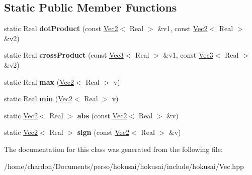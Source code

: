 \subsection*{Static Public Member Functions}
\begin{DoxyCompactItemize}
\item 
\hypertarget{classhokusai_1_1Vec2_ae9adba7c86e9fd15467694f6eabe49d5}{static Real {\bfseries dot\+Product} (const \hyperlink{classhokusai_1_1Vec2}{Vec2}$<$ Real $>$ \&v1, const \hyperlink{classhokusai_1_1Vec2}{Vec2}$<$ Real $>$ \&v2)}\label{classhokusai_1_1Vec2_ae9adba7c86e9fd15467694f6eabe49d5}

\item 
\hypertarget{classhokusai_1_1Vec2_acde8ab8c4be35179fda1d5b0c52e7a39}{static Real {\bfseries cross\+Product} (const \hyperlink{classhokusai_1_1Vec3}{Vec3}$<$ Real $>$ \&v1, const \hyperlink{classhokusai_1_1Vec3}{Vec3}$<$ Real $>$ \&v2)}\label{classhokusai_1_1Vec2_acde8ab8c4be35179fda1d5b0c52e7a39}

\item 
\hypertarget{classhokusai_1_1Vec2_ad44ab95bd955ad929aca423f2268e7f0}{static Real {\bfseries max} (\hyperlink{classhokusai_1_1Vec2}{Vec2}$<$ Real $>$ v)}\label{classhokusai_1_1Vec2_ad44ab95bd955ad929aca423f2268e7f0}

\item 
\hypertarget{classhokusai_1_1Vec2_a468f6993dba78df7e136497de7b85a8a}{static Real {\bfseries min} (\hyperlink{classhokusai_1_1Vec2}{Vec2}$<$ Real $>$ v)}\label{classhokusai_1_1Vec2_a468f6993dba78df7e136497de7b85a8a}

\item 
\hypertarget{classhokusai_1_1Vec2_a642930ab4b582b2cbc0ce76fa7fbbfe6}{static \hyperlink{classhokusai_1_1Vec2}{Vec2}$<$ Real $>$ {\bfseries abs} (const \hyperlink{classhokusai_1_1Vec2}{Vec2}$<$ Real $>$ \&v)}\label{classhokusai_1_1Vec2_a642930ab4b582b2cbc0ce76fa7fbbfe6}

\item 
\hypertarget{classhokusai_1_1Vec2_ad9b2bd8da4913b497fa8c923863205ab}{static \hyperlink{classhokusai_1_1Vec2}{Vec2}$<$ Real $>$ {\bfseries sign} (const \hyperlink{classhokusai_1_1Vec2}{Vec2}$<$ Real $>$ \&v)}\label{classhokusai_1_1Vec2_ad9b2bd8da4913b497fa8c923863205ab}

\end{DoxyCompactItemize}


The documentation for this class was generated from the following file\+:\begin{DoxyCompactItemize}
\item 
/home/chardon/\+Documents/perso/hokusai/hokusai/include/hokusai/Vec.\+hpp\end{DoxyCompactItemize}
